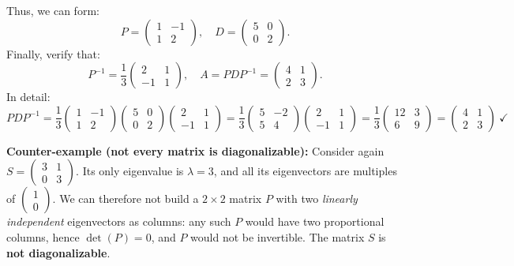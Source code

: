 \documentclass[]{article}
\begin{document}
	Thus, we can form:
	$$
	P = \begin{pmatrix} 1 & -1 \\ 1 & 2 \end{pmatrix},
	\quad D = \begin{pmatrix} 5 & 0 \\ 0 & 2 \end{pmatrix}.
	$$
	Finally, verify that:
	$$
	P^{-1} = \frac{1}{3} \begin{pmatrix} 2 & 1 \\ -1 & 1 \end{pmatrix},
	\quad A = PDP^{-1} = \begin{pmatrix} 4 & 1 \\ 2 & 3 \end{pmatrix}.
	$$
	In detail:
	$$
	PDP^{-1} = \frac{1}{3}\begin{pmatrix} 1 & -1 \\ 1 & 2 \end{pmatrix}\begin{pmatrix} 5 & 0 \\ 0 & 2 \end{pmatrix}\begin{pmatrix} 2 & 1 \\ -1 & 1 \end{pmatrix}
	= \frac{1}{3}\begin{pmatrix} 5 & -2 \\ 5 & 4 \end{pmatrix}\begin{pmatrix} 2 & 1 \\ -1 & 1 \end{pmatrix}
	= \frac{1}{3}\begin{pmatrix} 12 & 3 \\ 6 & 9 \end{pmatrix}
	= \begin{pmatrix} 4 & 1 \\ 2 & 3 \end{pmatrix} \ \checkmark
	$$

	\noindent \textbf{Counter-example (not every matrix is diagonalizable):}
	Consider again $S = \begin{pmatrix} 3 & 1 \\ 0 & 3 \end{pmatrix}$.
	Its only eigenvalue is $\lambda = 3$, and all its eigenvectors are multiples of $\begin{pmatrix} 1 \\ 0 \end{pmatrix}$.
	We can therefore not build a $2 \times 2$ matrix $P$ with two \textit{linearly independent} eigenvectors as columns: any such $P$ would have two proportional columns, hence $\det(P) = 0$, and $P$ would not be invertible.
	The matrix $S$ is \textbf{not diagonalizable}.
\end{document}
